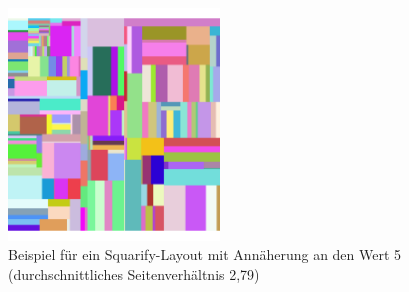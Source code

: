 \begin{figure}[h]
    \centering
    \includegraphics[width=0.5\textwidth]{images/fiveSquarify.png}
    \caption{Beispiel für ein Squarify-Layout mit Annäherung an den Wert 5 (durchschnittliches Seitenverhältnis 2,79)}
    \label{fig:squarifyRatio5}
\end{figure}